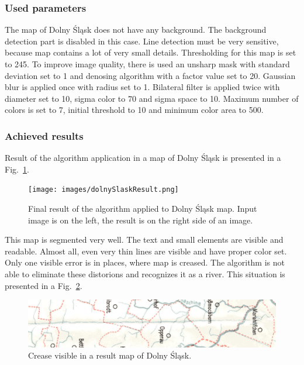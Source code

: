 \documentclass[a4paper,onecolumn,oneside,12pt]{memoir}
\begin{document}
\subsubsection{Used parameters}

The map of Dolny Śląsk does not have any background. The background detection part is disabled in
this case. Line detection must be very sensitive, because map contains a lot of very small details.
Thresholding for this map is set to 245. To improve image quality, there is used an unsharp mask
with standard deviation set to 1 and denosing algorithm with a factor value set to 20. Gaussian blur
is applied once with radius set to 1. Bilateral filter is applied twice with diameter set to 10,
sigma color to 70 and sigma space to 10. Maximum number of colors is set to 7, initial threshold
to 10 and minimum color area to 500.

\subsubsection{Achieved results}

Result of the algorithm application in a map of Dolny Śląsk is presented in a 
Fig.~\ref{dolnySlaskResult}.

\begin{figure}[!ht]
\begin{center}
\texttt{[image: images/dolnySlaskResult.png]}
\caption{Final result of the algorithm applied to Dolny Śląsk map. Input image is on the left, the
result is on the right side of an image.}
\label{dolnySlaskResult}
\end{center}
\end{figure}

This map is segmented very well. The text and small elements are visible and readable. Almost all,
even very thin lines are visible and have proper color set. Only one visible error is in places,
where map is creased. The algorithm is not able to eliminate these distorions and recognizes it
as a river. This situation is presented in a Fig.~\ref{dolnySlaskZagiecie}.

\begin{figure}[!ht]
\begin{center}
\includegraphics[scale=0.2]{images/dolnySlaskZagiecie.png}
\caption{Crease visible in a result map of Dolny Śląsk.}
\label{dolnySlaskZagiecie}
\end{center}
\end{figure}
\end{document}
